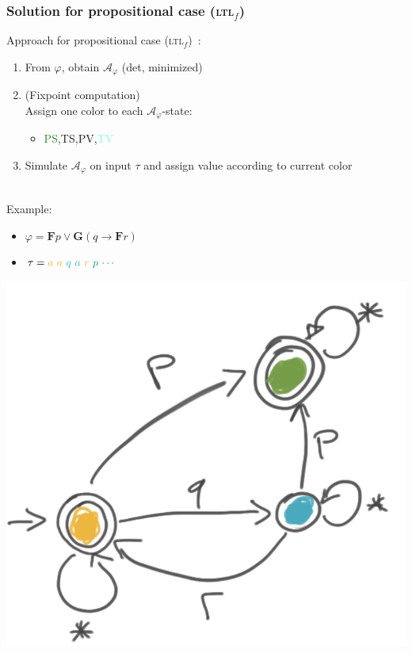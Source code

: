 \documentclass[xcolor=dvipsnames]{beamer}
\newcommand{\A}{\mathcal A\xspace}
\newcommand{\always}{\mathbf{G}\xspace}
\newcommand{\eventually}{\mathbf{F}\xspace}
\newcommand{\ltlf}{\textsc{ltl}$_f$\xspace}
\newcommand{\yellow}[1]{\textcolor{Dandelion}{#1}}
\newcommand{\blue}[1]{\textcolor{Aquamarine}{#1}}
\newcommand{\green}[1]{\textcolor{ForestGreen}{#1}}
\newcommand{\red}[1]{\textcolor{BrickRed}{#1}}
\begin{document}
\begin{frame}
\frametitle{Solution for propositional case (\ltlf)}

Approach for propositional case (\ltlf)~\cite{monitoring11}:  
\begin{enumerate}
	\item From $\varphi$, obtain $\A_\varphi$ (det, minimized)
	\item (Fixpoint computation)\\ 
		Assign one color to each $\A_\varphi$-state:
	\begin{itemize}
		\item \green{PS},\yellow{TS},\red{PV},\blue{TV}
	\end{itemize}
	\item Simulate $\A_\varphi$ on input $\tau$ and assign value according to current color
\end{enumerate}

~\\

Example:
\begin{itemize}
	\item $\varphi=\eventually p\lor \always(q\rightarrow\eventually r)$
	\item $\tau=\yellow{a}~\yellow{a}~\blue{q}~\blue{a}~\yellow{r}~\green{p}~\green{\cdots}$
\end{itemize}

\begin{center}
	\includegraphics[scale=.2]{figures/a_phi_colored}
\end{center}
\end{frame}
\end{document}
